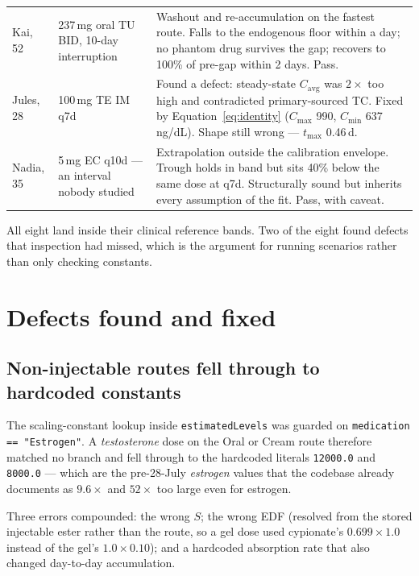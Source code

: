 \documentclass[11pt,a4paper]{article}
\newcommand{\good}[1]{\textcolor{ok}{#1}}
\newcommand{\code}[1]{\texttt{\small #1}}
\begin{document}
\begin{longtable}{@{}p{2.6cm}p{4.5cm}p{7.4cm}@{}}
Kai, 52 & 237\,mg oral TU BID, 10-day interruption
 & Washout and re-accumulation on the fastest route. Falls to the endogenous
   floor within a day; no phantom drug survives the gap; recovers to 100\% of
   pre-gap within 2 days. \good{Pass.} \\[0.4em]
Jules, 28 & 100\,mg TE IM q7d
 & Found a defect: steady-state $C_{\mathrm{avg}}$ was $2\times$ too high and
   contradicted primary-sourced TC. \good{Fixed} by Equation~\ref{eq:identity}
   ($C_{\max}$ 990, $C_{\min}$ 637\,ng/dL). Shape still wrong --- $t_{\max}$
   0.46\,d. \\[0.4em]
Nadia, 35 & 5\,mg EC q10d --- an interval nobody studied
 & Extrapolation outside the calibration envelope. Trough holds in band but sits
   40\% below the same dose at q7d. Structurally sound but inherits every
   assumption of the fit. \good{Pass, with caveat.} \\
\bottomrule
\end{longtable}

All eight land inside their clinical reference bands. Two of the eight found
defects that inspection had missed, which is the argument for running scenarios
rather than only checking constants.

\section{Defects found and fixed}
\label{sec:defects}

\subsection{Non-injectable routes fell through to hardcoded constants}

The scaling-constant lookup inside \code{estimatedLevels} was guarded on
\code{medication == "Estrogen"}. A \emph{testosterone} dose on the Oral or Cream
route therefore matched no branch and fell through to the hardcoded literals
\code{12000.0} and \code{8000.0} --- which are the pre-28-July \emph{estrogen}
values that the codebase already documents as $9.6\times$ and $52\times$ too
large even for estrogen.

Three errors compounded: the wrong $S$; the wrong EDF (resolved from the stored
injectable ester rather than the route, so a gel dose used cypionate's
$0.699 \times 1.0$ instead of the gel's $1.0 \times 0.10$); and a hardcoded
absorption rate that also changed day-to-day accumulation.
\end{document}
